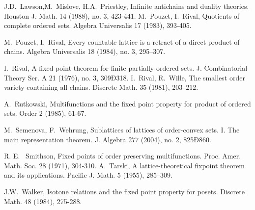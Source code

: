 \documentclass[12pt]{amsart}
\begin{document}
\begin{thebibliography}{10pt}
J.D.~Lawson,M.~Mislove, H.A.~Priestley, 
\newblock Infinite antichains and duality theories.
Houston J. Math. 14 (1988), no. 3, 423-441. 
M.~Pouzet, I.~Rival, 
\newblock Quotients of complete ordered sets.
Algebra Universalis 17 (1983), 393-405.

M.~Pouzet, I.~Rival, 
\newblock Every countable lattice is a retract of a direct product of chains. 
Algebra Universalis 18 (1984), no. 3, 295--307.

I.~Rival,
\newblock  A fixed point theorem for finite partially ordered sets. J. Combinatorial Theory Ser. A 21 (1976), no. 3, 309Ð318.
I.~Rival, R.~Wille, 
\newblock The smallest order variety containing all chains. 
Discrete Math. 35 (1981), 203--212.

A.~Rutkowski, 
\newblock Multifunctions and the fixed point property for product of ordered  sets. 
Order 2 (1985), 61-67.

M.~Semenova, F.~Wehrung, 
\newblock Sublattices of lattices of order-convex sets. I. The main representation theorem. J. Algebra 277 (2004), no. 2, 825Ð860. 

R. E.~ Smithson,  
\newblock Fixed points of order preserving multifunctions. Proc. Amer. Math. Soc.
28 (1971),  304-310.
A.~Tarski, 
\newblock A lattice-theoretical fixpoint theorem and its applications.
Pacific J. Math. 5 (1955), 285--309.

J.W.~Walker, 
\newblock Isotone relations and the fixed point property for posets. Discrete Math. 48 (1984), 275-288.
\end{thebibliography}
\end{document}
